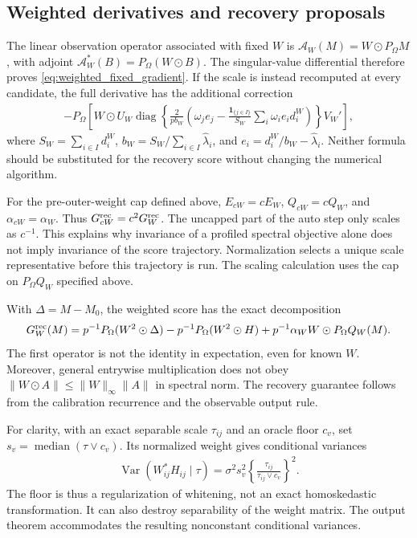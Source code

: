 \documentclass[numsec,webpdf,modern,large,namedate]{oup-authoring-template}
\theoremstyle{plain}
\theoremstyle{remark}
\newif\ifmarkchanges
\newenvironment{revision}{\begingroup\ifmarkchanges\color{red}\fi}{\endgroup}
\begin{document}
\begin{revision}
\subsection{Weighted derivatives and recovery proposals}
The linear observation operator associated with fixed $W$ is
$\mathcal A_W(M)=W\odot P_\Omega M$, with adjoint
$\mathcal A_W^*(B)=P_\Omega(W\odot B)$. The singular-value differential
therefore proves \eqref{eq:weighted_fixed_gradient}. If the scale is
instead recomputed at every candidate, the full derivative has the
additional correction
\begin{align*}
 -P_\Omega\!\left[W\odot U_W\operatorname{diag}\left\{
 \frac{2}{pb_W}\left(\omega_j e_j-
 \frac{\mathbf1_{\{j\in I\}}}{S_W}
 \sum_i\omega_i e_i d_i^W\right)\right\}V_W'\right],
\end{align*}
where $S_W=\sum_{i\in I}d_i^W$, $b_W=S_W/\sum_{i\in I}\widehat\lambda_i$,
and $e_i=d_i^W/b_W-\widehat\lambda_i$.
Neither formula should be substituted for the recovery score without
changing the numerical algorithm.

For the pre-outer-weight cap defined above,
$E_{cW}=cE_W$, $Q_{cW}=cQ_W$, and $\alpha_{cW}=\alpha_W$.
Thus $G_{cW}^{\rm rec}=c^2G_W^{\rm rec}$. The uncapped part of the auto
step only scales as $c^{-1}$. This explains why invariance of a profiled
spectral objective alone does not imply invariance of the score
trajectory. Normalization selects a unique scale representative before
this trajectory is run. The scaling calculation uses the cap on $P_\Omega Q_W$ specified above.

With $\Delta=M-M_0$, the weighted score has the exact decomposition
\begin{align}
 G_W^{\rm rec}(M)
 =p^{-1}P_\Omega(W^2\odot\Delta)
  -p^{-1}P_\Omega(W^2\odot H)
  +p^{-1}\alpha_W W\odot P_\Omega Q_W(M).
 \label{eq:wc_weighted_score_decomp}
\end{align}
The first operator is not the identity in expectation, even for known
$W$. Moreover, general entrywise multiplication does not obey
$\|W\odot A\|\le\|W\|_\infty\|A\|$ in spectral norm. The recovery guarantee follows from the calibration recurrence and the observable output rule.

For clarity, with an exact separable scale $\tau_{ij}$ and an oracle
floor $c_v$, set $s_v=\operatorname{median}(\tau\vee c_v)$. Its normalized
weight gives conditional variances
\begin{align}
 \operatorname{Var}(W_{ij}^*H_{ij}\mid\tau)
 =\sigma^2s_v^2\left\{\frac{\tau_{ij}}{\tau_{ij}\vee c_v}\right\}^2.
 \label{eq:wc_residual_variance_after_floor}
\end{align}
The floor is thus a regularization of whitening, not an exact
homoskedastic transformation. It can also destroy separability of the
weight matrix. The output theorem accommodates the resulting nonconstant conditional variances.
\end{revision}
\end{document}
